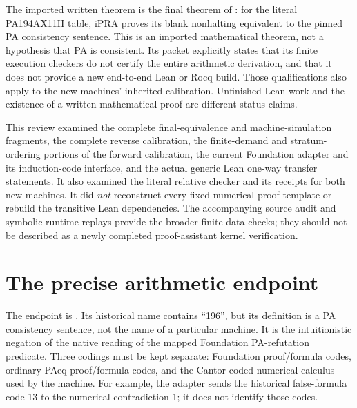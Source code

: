 \documentclass[11pt]{article}
\newcommand{\IPRA}{\mathrm{iPRA}}
\begin{document}
The imported written theorem is the final theorem of
: for the literal PA194AX11H
table, \(\IPRA\) proves its blank nonhalting equivalent to the pinned
PA consistency sentence.  This is an imported mathematical theorem,
not a hypothesis that PA is consistent.  Its packet explicitly states
that its finite execution checkers do not certify the entire arithmetic
derivation, and that it does not provide a new end-to-end Lean or Rocq
build.  Those qualifications also apply to the new machines' inherited
calibration.  Unfinished Lean work and the existence of a written
mathematical proof are different status claims.\cite{ax11h}

This review examined the complete final-equivalence and machine-simulation
fragments, the complete reverse calibration, the finite-demand and
stratum-ordering portions of the forward calibration, the current
Foundation adapter and its induction-code interface, and the actual
generic Lean one-way transfer statements.  It also examined the literal
relative checker and its receipts for both new machines.  It did
\emph{not} reconstruct every fixed numerical proof template or rebuild the
transitive Lean dependencies.  The accompanying source audit and symbolic
runtime replays provide the broader finite-data checks; they should not
be described as a newly completed proof-assistant kernel verification.

\section{The precise arithmetic endpoint}

The endpoint is
.
Its historical name contains ``196'', but its definition is a PA
consistency sentence, not the name of a particular machine.
It is the intuitionistic negation of the native reading of the mapped
Foundation PA-refutation predicate.  Three codings must be kept separate:
Foundation proof/formula codes, ordinary-PAeq proof/formula codes, and
the Cantor-coded numerical calculus used by the machine.  For example,
the adapter sends the historical false-formula code 13 to the numerical
contradiction 1; it does not identify those codes.\cite{adapter,transfer}
\end{document}
